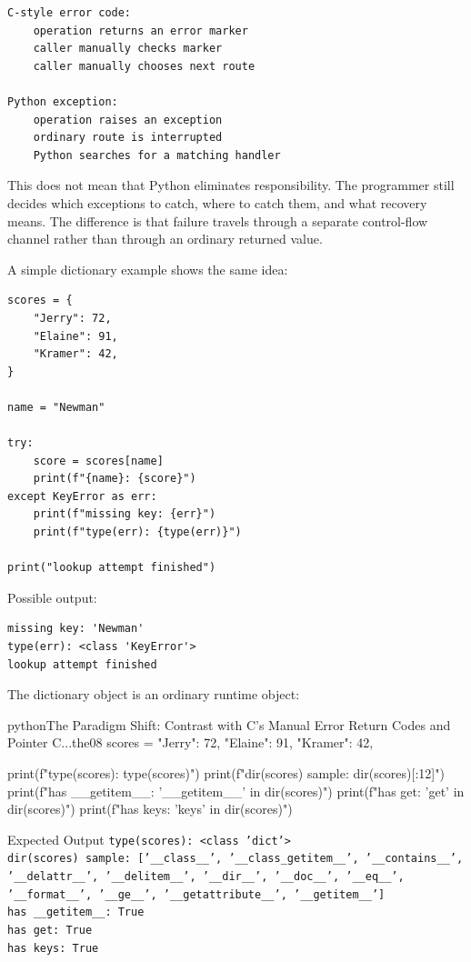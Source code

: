 \documentclass[a4paper,twoside]{report}
\begin{document}
\begin{verbatim}
C-style error code:
    operation returns an error marker
    caller manually checks marker
    caller manually chooses next route

Python exception:
    operation raises an exception
    ordinary route is interrupted
    Python searches for a matching handler
\end{verbatim}

This does not mean that Python eliminates responsibility. The programmer still decides which exceptions to catch, where to catch them, and what recovery means. The difference is that failure travels through a separate control-flow channel rather than through an ordinary returned value.

A simple dictionary example shows the same idea:

\begin{verbatim}
scores = {
    "Jerry": 72,
    "Elaine": 91,
    "Kramer": 42,
}

name = "Newman"

try:
    score = scores[name]
    print(f"{name}: {score}")
except KeyError as err:
    print(f"missing key: {err}")
    print(f"type(err): {type(err)}")

print("lookup attempt finished")
\end{verbatim}

Possible output:

\begin{verbatim}
missing key: 'Newman'
type(err): <class 'KeyError'>
lookup attempt finished
\end{verbatim}

The dictionary object is an ordinary runtime object:

\begin{codebox}[]{python}{The Paradigm Shift: Contrast with C's Manual Error Return Codes and Pointer C...}{the08}
scores = {
    "Jerry": 72,
    "Elaine": 91,
    "Kramer": 42,
}

print(f"type(scores): {type(scores)}")
print(f"dir(scores) sample: {dir(scores)[:12]}")
print(f"has __getitem__: {'__getitem__' in dir(scores)}")
print(f"has get: {'get' in dir(scores)}")
print(f"has keys: {'keys' in dir(scores)}")
\end{codebox}


\begin{iobox}{Expected Output}
\texttt{type(scores): <class 'dict'>} \\
\texttt{dir(scores) sample: ['\_\_class\_\_', '\_\_class\_getitem\_\_', '\_\_contains\_\_',} \\
\texttt{'\_\_delattr\_\_', '\_\_delitem\_\_', '\_\_dir\_\_', '\_\_doc\_\_', '\_\_eq\_\_',} \\
\texttt{'\_\_format\_\_', '\_\_ge\_\_', '\_\_getattribute\_\_', '\_\_getitem\_\_']} \\
\texttt{has \_\_getitem\_\_: True} \\
\texttt{has get: True} \\
\texttt{has keys: True} \\
\end{iobox}
\end{document}
